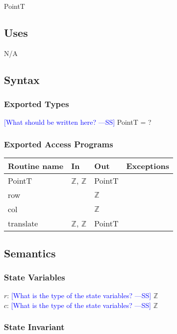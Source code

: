 \documentclass[12pt]{article}
\newcommand{\authornote}[3]{\textcolor{#1}{[#3 ---#2]}}
\newcommand{\authornote}[3]{}
\newcommand{\wss}[1]{\authornote{blue}{SS}{#1}}
\begin{document}
PointT

\subsection* {Uses}

N/A

\subsection* {Syntax}

\subsubsection* {Exported Types}

\wss{What should be written here?} PointT = ?

\subsubsection* {Exported Access Programs}

\begin{tabular}{| l | l | l | l |}
\hline
\textbf{Routine name} & \textbf{In} & \textbf{Out} & \textbf{Exceptions}\\
\hline
PointT & $\mathbb{Z}$, $\mathbb{Z}$ & PointT & \\
\hline
row & ~ & $\mathbb{Z}$ & ~\\
\hline
col & ~ & $\mathbb{Z}$ & ~\\
\hline
translate & $\mathbb{Z}$, $\mathbb{Z}$ & PointT & ~\\
\hline
\end{tabular}

\subsection* {Semantics}

\subsubsection* {State Variables}

$r$: \wss{What is the type of the state variables?} $\mathbb{Z}$\\
$c$: \wss{What is the type of the state variables?} $\mathbb{Z}$\\

\subsubsection* {State Invariant}
\end{document}
